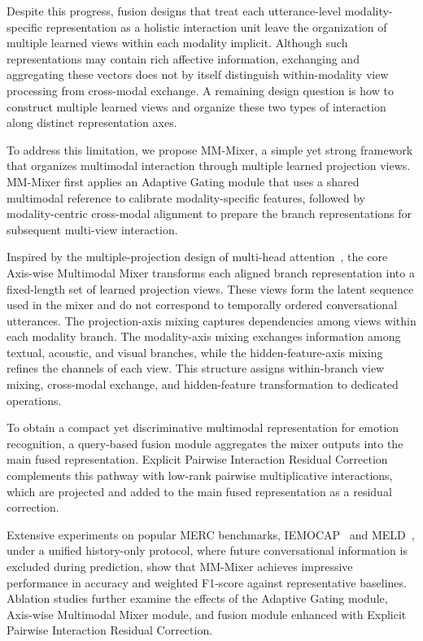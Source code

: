 \documentclass[letterpaper]{article} %
\begin{document}
Despite this progress, fusion designs that treat each utterance-level modality-specific representation as a holistic interaction unit leave the organization of multiple learned views within each modality implicit. Although such representations may contain rich affective information, exchanging and aggregating these vectors does not by itself distinguish within-modality view processing from cross-modal exchange. A remaining design question is how to construct multiple learned views and organize these two types of interaction along distinct representation axes.

To address this limitation, we propose MM-Mixer, a simple yet strong framework that organizes multimodal interaction through multiple learned projection views. MM-Mixer first applies an Adaptive Gating module that uses a shared multimodal reference to calibrate modality-specific features, followed by modality-centric cross-modal alignment to prepare the branch representations for subsequent multi-view interaction.

Inspired by the multiple-projection design of multi-head attention~\cite{vaswani2017attention}, the core Axis-wise Multimodal Mixer transforms each aligned branch representation into a fixed-length set of learned projection views. These views form the latent sequence used in the mixer and do not correspond to temporally ordered conversational utterances. The projection-axis mixing captures dependencies among views within each modality branch. The modality-axis mixing exchanges information among textual, acoustic, and visual branches, while the hidden-feature-axis mixing refines the channels of each view. This structure assigns within-branch view mixing, cross-modal exchange, and hidden-feature transformation to dedicated operations.

To obtain a compact yet discriminative multimodal representation for emotion recognition, a query-based fusion module aggregates the mixer outputs into the main fused representation. Explicit Pairwise Interaction Residual Correction complements this pathway with low-rank pairwise multiplicative interactions, which are projected and added to the main fused representation as a residual correction.

Extensive experiments on popular MERC benchmarks, IEMOCAP~\cite{iemocap} and MELD~\cite{meld}, under a unified history-only protocol, where future conversational information is excluded during prediction, show that MM-Mixer achieves impressive performance in accuracy and weighted F1-score against representative baselines. Ablation studies further examine the effects of the Adaptive Gating module, Axis-wise Multimodal Mixer module, and fusion module enhanced with Explicit Pairwise Interaction Residual Correction.
\end{document}
